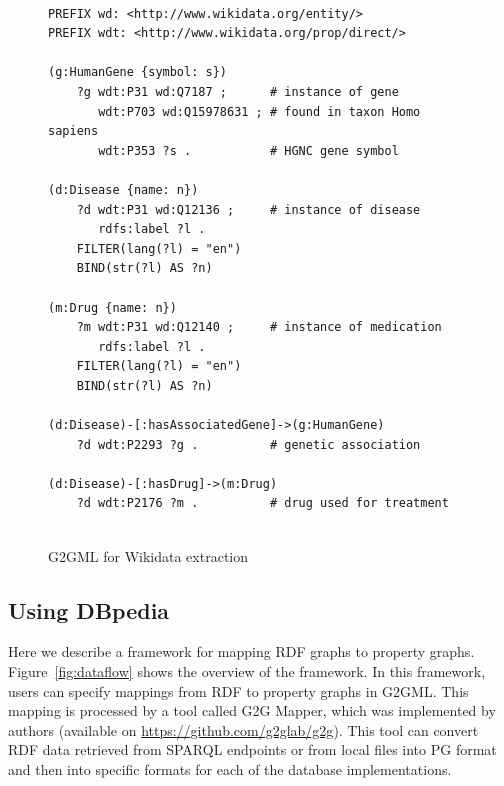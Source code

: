 \documentclass[runningheads]{llncs}
\begin{document}
\begin{figure}[!t]
\vspace{2mm}
\begin{scriptsize}
\begin{verbatim}
 
PREFIX wd: <http://www.wikidata.org/entity/>
PREFIX wdt: <http://www.wikidata.org/prop/direct/>
 
(g:HumanGene {symbol: s})
    ?g wdt:P31 wd:Q7187 ;      # instance of gene
       wdt:P703 wd:Q15978631 ; # found in taxon Homo sapiens
       wdt:P353 ?s .           # HGNC gene symbol
 
(d:Disease {name: n})
    ?d wdt:P31 wd:Q12136 ;     # instance of disease
       rdfs:label ?l .
    FILTER(lang(?l) = "en")
    BIND(str(?l) AS ?n)
 
(m:Drug {name: n})
    ?m wdt:P31 wd:Q12140 ;     # instance of medication
       rdfs:label ?l .
    FILTER(lang(?l) = "en")
    BIND(str(?l) AS ?n)
 
(d:Disease)-[:hasAssociatedGene]->(g:HumanGene)
    ?d wdt:P2293 ?g .          # genetic association
 
(d:Disease)-[:hasDrug]->(m:Drug)
    ?d wdt:P2176 ?m .          # drug used for treatment
 
\end{verbatim}
\end{scriptsize}
\caption{G2GML for Wikidata extraction}
\label{fig:g2gml_wikidata}
\end{figure}
 
 
\subsection{Using DBpedia}
 
Here we describe a framework for mapping RDF graphs to property graphs.
Figure~\ref{fig:dataflow} shows the overview of the framework.
In this framework, users can specify mappings from RDF to property graphs in G2GML.
This mapping is processed by a tool called G2G Mapper, which was implemented by authors (available on \url{https://github.com/g2glab/g2g}). This tool can convert RDF data retrieved from SPARQL endpoints or from local files into PG format and then into specific formats for each of the database implementations.
 
\end{document}
